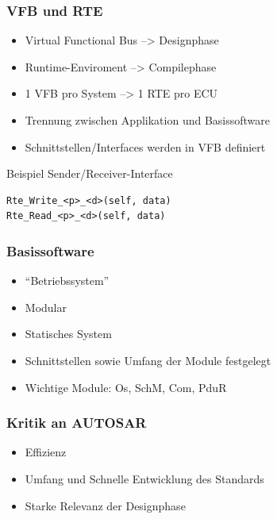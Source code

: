 \documentclass[]{beamer}
\begin{document}
\begin{frame}[fragile]
\frametitle{VFB und RTE}
    \begin{itemize}
        \item Virtual Functional Bus --> Designphase
        \item Runtime-Enviroment --> Compilephase
        \item 1 VFB pro System --> 1 RTE pro ECU
        \item Trennung zwischen Applikation und Basissoftware
        \item Schnittstellen/Interfaces werden in VFB definiert
    \end{itemize}
    \begin{exampleblock}{Beispiel Sender/Receiver-Interface}
        \begin{verbatim}
Rte_Write_<p>_<d>(self, data)
Rte_Read_<p>_<d>(self, data)
        \end{verbatim}
    \end{exampleblock}
\end{frame}


\begin{frame}
\frametitle{Basissoftware}
    \begin{itemize}
        \item "`Betriebssystem"'
        \item Modular
        \item Statisches System
        \item Schnittstellen sowie Umfang der Module festgelegt
        \item Wichtige Module: Os, SchM, Com, PduR
    \end{itemize}
\end{frame}




\begin{frame}
\frametitle{Kritik an AUTOSAR}
    \begin{itemize}
        \item Effizienz
        \item Umfang und Schnelle Entwicklung des Standards
        \item Starke Relevanz der Designphase
    \end{itemize}
\end{frame}









\end{document}
